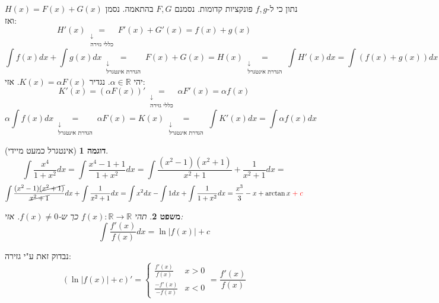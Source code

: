\documentclass[12pt]{article}
\makeatletter
\let\oldint\int
\renewcommand{\int}{\oldint\limits}
\theoremstyle{plain}
\newtheorem{theorem}{משפט}[section]      %
\theoremstyle{definition}
\newtheorem{example}[theorem]{דוגמה}      %
\theoremstyle{remark}
\renewenvironment{proof}[1][\proofname]{\par
  \pushQED{\qed}%
  \normalfont \topsep6\p@\@plus6\p@\relax
  \trivlist
  \item[\hskip\labelsep\itshape #1\@addpunct{.}]\par\ignorespaces
}{%
  \popQED\endtrivlist\@endpefalse
}
\renewcommand{\qed}{\par\nobreak\hfill\qedsymbol\par}
\renewcommand{\proofname}{הוכחה}          %
\makeatother
\begin{document}
\begin{proof}
נתון כי ל-\({f,g}\) פונקציות קדומות. נסמנם \({F,G}\) בהתאמה.\newline{}
נסמן \({H(x)=F(x)+G(x)}\) ואז:\[
{H'(x) \underset{\begin{matrix}
\downarrow \\
{\text{כללי גזירה}}
\end{matrix}}{=}F'(x)+G'(x)=f(x)+g(x)}
\]
\[
{\int f(x)dx+\int g(x)dx \underset{\begin{matrix}
\downarrow \\
{\text{הגדרת אינטגרל}}
\end{matrix}}{=} F(x)+G(x)=H(x) \underset{\begin{matrix}
\downarrow \\
{\text{הגדרת אינטגרל}}
\end{matrix}}{=}\int H'(x)dx=\int (f(x)+g(x))dx}
\]
יהי \({\alpha \in \mathbb{R}}\). נגדיר \({K(x)=\displaystyle \alpha F(x)}\). אזי:\[
{K'(x)=(\alpha F(x))' \underset{\begin{matrix}
\downarrow \\
{\text{כללי גזירה}}
\end{matrix}}{=}\alpha F'(x)=\alpha f(x)}
\]
\[
{\alpha \int f(x)dx \underset{\begin{matrix}
\downarrow \\
{\text{הגדרת אינטגרל}}
\end{matrix}}{=}\alpha F(x)=K(x) \underset{\begin{matrix}
\downarrow \\
{\text{הגדרת אינטגרל}}
\end{matrix}}{=} \int K'(x)dx=\int\alpha f(x)dx}
\]

\end{proof}
\begin{example}[אינטגרל כמעט מיידי]
\[
{\int \frac{x^4}{1+x^2}dx=\int \frac{x^4-1+1}{1+x^2}dx=\int \frac{(x^2-1)(x^2+1)}{x^2+1}+\frac{1}{x^2+1}dx=}
\]
\[
{\int\frac{(x^2-1)\cancel{ (x^2+1) }}{\cancel{ x^2+1 }}dx+\int \frac{1}{x^2+1}dx=\int x^2dx-\int1dx+\int \frac{1}{1+x^2}dx=\frac{x^3}{3}-x+\arctan x {\; \color{red}+\; c}}
\]

\end{example}
\begin{theorem}
תהי \({f(x):\mathbb{R}\to \mathbb{R}}\) כך ש-\({f(x)\neq 0}\). אזי:\[
{\int \frac{f'(x)}{f(x)}dx=\ln |f(x)|+c}
\]

\end{theorem}
נבדוק זאת ע"י גזירה:\[
{(\ln|f(x)|+c)'=\begin{cases}
\frac{f'(x)}{f(x)} & x>0 \\
\frac{-f'(x)}{-f(x)} & x<0
\end{cases}=\frac{f'(x)}{f(x)}}
\]
\end{document}
